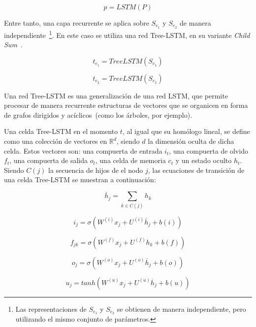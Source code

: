 \begin{equation*}
	p = LSTM(P)
\end{equation*}

Entre tanto, una capa recurrente se aplica sobre $S_{e_1}$ y $S_{e_2}$ de manera independiente~\footnote{Las representaciones de $S_{e_1}$ y $S_{e_2}$ se obtienen de manera independiente, pero utilizando el mismo conjunto de parámetros.}.
En este caso se utiliza una red Tree-LSTM, en su variante \textit{Child Sum}~\cite{tai2015improved}.

\begin{equation*}
	t_{e_1} = TreeLSTM(S_{e_1})
\end{equation*}


\begin{equation*}
	t_{e_2} = TreeLSTM(S_{e_2})
\end{equation*}


Una red Tree-LSTM es una generalización de una red LSTM, que permite procesar de manera recurrente estructuras de vectores que se organicen en forma de grafos dirigidos y acíclicos~(como los árboles, por ejemplo).

Una celda Tree-LSTM en el momento $t$, al igual que su homólogo lineal, se define como una colección de vectores en $\mathbb{R}^d$, siendo $d$ la dimensión oculta de dicha celda.
Estos vectores son: una compuerta de entrada $i_t$, una compuerta de olvido $f_t$, una compuerta de salida $o_t$, una celda de memoria $c_t$ y un estado oculto $h_t$. Siendo $C(j)$ la secuencia de hijos de el nodo $j$, las ecuaciones de transición de una celda Tree-LSTM se muestran a continuación:

\begin{equation*}
	\overline{h}_j = \sum_{k\in C(j)} h_k
\end{equation*}

\begin{equation*}
i_j = \sigma(W^{(i)}x_j + U^{(i)}\overline{h}_j + b(i))
\end{equation*}

\begin{equation*}
f_{jk} = \sigma(W^{(f)}x_j + U^{(f)}h_k + b(f))
\end{equation*}

\begin{equation*}
o_j = \sigma(W^{(o)}x_j + U^{(o)}\overline{h}_j + b(o))
\end{equation*}

\begin{equation*}
u_j = tanh(W^{(u)}x_j + U^{(u)}\overline{h}_j + b(u))
\end{equation*}

